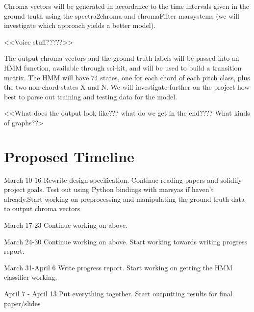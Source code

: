 \documentclass{article}
\begin{document}
Chroma vectors will be generated in accordance to the time intervals
given in the ground truth using the spectra2chroma and chromaFilter marsystems (we will investigate which approach
yields a better model).

<<Voice stuff?????>>

The output chroma vectors and the ground truth labels will be passed into an HMM function, available through
sci-kit, and will be used to build a transition matrix. The HMM will have 74 states, one for each chord of each
pitch class, plus the two non-chord states X and N. We will investigate further on the project how best
to parse out training and testing data for the model.

<<What does the output look like??? what do we get in the end???? What kinds of graphs??>


\section{Proposed Timeline}\label{sec:timeline}

March 10-16\newline
Rewrite design specification. Continue reading papers and solidify project goals. Test out using Python 
bindings with marsyas if haven't already.Start working on preprocessing and 
manipulating the ground truth data to output chroma vectors\newline
\newline

March 17-23\newline
Continue working on above.\newline
\newline

March 24-30\newline 
Continue working on above. Start working towards writing progress report.\newline
\newline

March 31-April 6\newline
Write progress report. Start working on getting the HMM classifier working.\newline
\newline

April 7 - April 13\newline
Put everything together. Start outputting results for final paper/slides\newline
\newline
\end{document}
